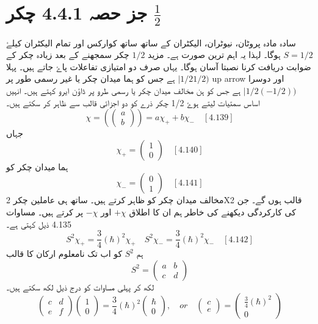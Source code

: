 \documentclass{book}
\begin{document}
\section*{جز حصہ 4.4.1 چکر $\frac{1}{2}$ }
سادہ مادہ پروٹان، نیوٹران، الیکٹران کے ساتھ ساتھ کوارکس اور تمام الیکٹران کیلۓ $ S=1/2 $ ہوگا۔ لہذا یہ اہم ترین صورت ہے۔ مزید $ 1/2 $ چکر سمجھنے کے بعد زیادہ چکر کے ضوابت دریافت کرنا نصبتا آسان ہوگا۔ یہاں صرف دو امتیازی تفاعلات پاۓ جاتے ہیں۔ پہلا $ |1/2 1/2 ) $ ہے جس کو ہما میدان چکر یا غیر رسمی طور پر up arrow اور دوسرا $ |1/2(-1/2)) $ ہے جس کو ہن مخالف میدان چکر یا رسمی طرو پر ڈاؤن ایرو کہتے ہیں۔ انہیں اساس سمتیات لیتے ہوۓ 1/2 چکر ذرے کو دو اجزائی قالب سے ظاہر کر سکتے ہیں۔
$$ \chi=( \left(\begin{matrix} a \\ b \end{matrix}\right))= a\chi_{+} + b\chi_{-} \quad [4.139] $$
جہاں
$$ \chi_{+}=\left(\begin{matrix}1\\0 \end{matrix}\right)\quad [4.140] $$
ہما میدان چکر کو 
$$ \chi_{-}=\left(\begin{matrix}0 \\1 \end{matrix}\right)\quad [4.141] $$
مخالف میدان چکر کو ظاہر کرتے ہیں۔
ساتھ ہی عاملین چکر 2X2 قالب ہوں گے۔ جن کی کارکردگی دیکھنے کی خاطر ہم ان کا اطلاق $ +\chi $ اور $ -\chi $ پر کرتے ہیں۔ مساوات 4.135 ذیل کہتی ہے۔
$$ S^2\chi_{+}=\frac{3}{4}(\hbar)^2\chi_{+} \quad S^2\chi_{-}= \frac{3}{4}(\hbar)^2 \chi_{-} \quad [4.142] $$
ہم $ S^2 $ کو اب تک نامعلوم ارکان کا قالب 
$$ S^2= \left(\begin{matrix}a & b\\c & d\end{matrix}\right) $$
لکھ کر پہلی مساوات کو درج ذیل لکھ سکتے ہیں۔
$$ \left(\begin{matrix}c & d \\ e & f \end{matrix}\right) \left(\begin{matrix}1\\0 \end{matrix}\right) = \frac{3}{4}(\hbar)^2 \left(\begin{matrix}\hbar \\0 \end{matrix}\right) , \quad or \quad \left(\begin{matrix}c\\e \end{matrix}\right)= \left(\begin{matrix}\frac{3}{4}(\hbar)^2 \\ 0 \end{matrix}\right) $$
\end{document}
